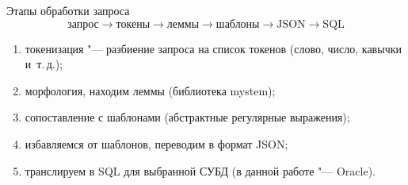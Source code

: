 \begin{frame}{Этапы обработки запроса}%
  \[
        \text{запрос}
    \to \text{токены}
    \to \text{леммы}
    \to \text{шаблоны}
    \to \text{JSON}
    \to \text{SQL}
  \]
  \begin{enumerate}%
    \item токенизация "--- разбиение запроса на список токенов (слово, число, кавычки и~т.\,д.);
    \item морфология, находим леммы (библиотека mystem);
    \item сопоставление с шаблонами (абстрактные регулярные выражения);
    \item избавляемся от шаблонов, переводим в формат JSON;
    \item транслируем в SQL для выбранной СУБД (в данной работе "--- Oracle).
  \end{enumerate}
\end{frame}
